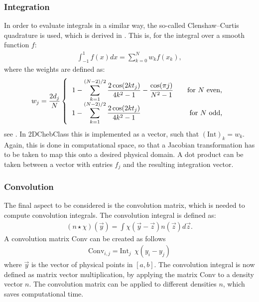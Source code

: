 \documentclass[11pt, a4paper]{article}
\theoremstyle{definition}
\begin{document}
\subsubsection{Integration}
In order to evaluate integrals in a similar way, the so-called Clenshaw--Curtis quadrature is used, which is derived in \cite{ClenCurt1}.
This is, for the integral over a smooth function $f$:
\begin{align}\label{eqnClenCurtQuad}
	\int_{-1}^1 f(x)dx = \sum_{k=0}^N w_kf(x_k),
\end{align}
where the weights are defined as:
\begin{align*}
	w_j = \frac{2d_j}{N}
	\left \{
	\begin{tabular}{c}
		$1- \displaystyle \sum_{k=1}^{(N-2)/2} \frac{2 \cos(2kt_j)}{4k^2-1} - \frac{\cos(\pi j)}{N^2 -1} \quad \quad\text{for $N$ even}$,\\
		$1- \displaystyle \sum_{k=1}^{(N-2)/2} \frac{2 \cos(2kt_j)}{4k^2-1} \quad \quad \quad \quad \quad \quad \ \ \ \text{for $N$ odd}$,
	\end{tabular}
	\right .
\end{align*}
see \cite{GoddardPseudospectralCode1}. In 2DChebClass this is implemented as a vector, such that $(\text{Int})_k = w_k$. Again, this is done in computational space, so that a Jacobian transformation has to be taken to map this onto a desired physical domain. A dot product can be taken between a vector with entries $f_j$ and the resulting integration vector. 
\subsubsection{Convolution}
The final aspect to be considered is the convolution matrix, which is needed to compute convolution integrals. 
The convolution integral is defined as:
\begin{align*}
	\left(n \star \chi \right) (\vec y) = \int \chi ( \vec y - \vec{ z}) n (\vec{z}) d \vec{z}.
\end{align*}
A convolution matrix Conv can be created as follows
\begin{align*}
	\text{Conv}_{i,j} = \text{Int}_j \ \ \chi( y_i -  y_j)
\end{align*}
where $\vec y$ is the vector of physical points in $[a,b]$.
 The convolution integral is now defined as matrix vector multiplication, by applying the matrix Conv to a density vector $n$. The convolution matrix can be applied to different densities $n$, which saves computational time. 
\end{document}

